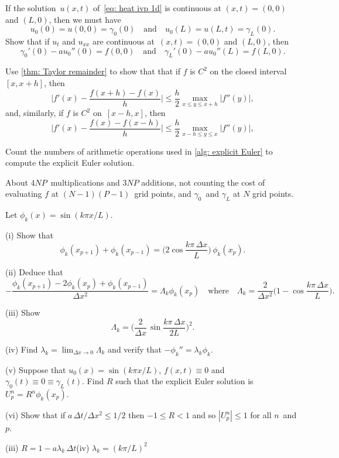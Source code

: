 \begin{Exercises}

\exercise
If the solution~$u(x,t)$ of~\eqref{eq: heat ivp 1d} is continuous
at $(x,t)=(0,0)$ and $(L,0)$, then we must have
\[
u_0(0)=u(0,0)=\gamma_0(0)\quad\text{and}\quad
u_0(L)=u(L,t)=\gamma_L(0).
\]
Show that if $u_t$ and $u_{xx}$ are continuous at~$(x,t)=(0,0)$ and $(L,0)$,
then
\[
\gamma_0'(0)-au_0''(0)=f(0,0)
\quad\text{and}\quad
\gamma_L'(0)-au_0''(L)=f(L,0).
\]

\exercise\label{ex: forward diff}
Use \cref{thm: Taylor remainder} to show that that if $f$ is $C^2$ on 
the closed interval~$[x,x+h]$, then
\[
\biggl|f'(x)-\frac{f(x+h)-f(x)}{h}\biggr|
	\le\frac{h}{2}\max_{x\le y\le x+h}|f''(y)|,
\]
and, similarly, if $f$ is $C^2$ on~$[x-h,x]$, then
\[
\biggl|f'(x)-\frac{f(x)-f(x-h)}{h}\biggr|
	\le\frac{h}{2}\max_{x-h\le y\le x}|f''(y)|,
\]

\exercise
Count the numbers of arithmetic operations used in \cref{alg: explicit Euler} 
to compute the explicit Euler solution.
\begin{ans}
About $4NP$~multiplications and $3NP$ additions, not counting the cost of
evaluating $f$ at $(N-1)(P-1)$~grid points, and $\gamma_0$~and $\gamma_L$
at $N$ grid points.
\end{ans}

\exercise
Let $\phi_k(x)=\sin(k\pi x/L)$.
\begin{description}
\item{(i)} Show that 
\[
\phi_k(x_{p+1})+\phi_k(x_{p-1})=\biggl(2\cos\frac{k\pi\,\Delta x}{L}\biggr)\,
	\phi_k(x_p).
\]
\item{(ii)} Deduce that
\[
-\frac{\phi_k(x_{p+1})-2\phi_k(x_p)+\phi_k(x_{p-1})}{\Delta x^2}
	=\Lambda_k\phi_k(x_p)\quad\text{where}\quad
\Lambda_k=\frac{2}{\Delta x^2}\biggl(1-\cos\frac{k\pi\,\Delta x}{L}\biggr).
\]
\item{(iii)} Show
\[
\Lambda_k=\biggl(\frac{2}{\Delta x}\,\sin\frac{k\pi\,\Delta x}{2L}\biggr)^2.
\]
\item{(iv)}
Find $\lambda_k=\lim_{\Delta x\to0}\Lambda_k$ and verify that 
$-\phi_k''=\lambda_k\phi_k$.
\item{(v)}
Suppose that $u_0(x)=\sin(k\pi x/L)$, $f(x,t)\equiv0$ and 
$\gamma_0(t)\equiv 0\equiv\gamma_L(t)$.  Find $R$ such that the explicit
Euler solution is~$U^n_p=R^n\phi_k(x_p)$.
\item{(vi)} Show that if $a\,\Delta t/\Delta x^2\le1/2$ then $-1\le R<1$
and so $|U^n_p|\le1$ for all $n$~and $p$.
\end{description}
\begin{ans}
(iii) $R=1-a\lambda_k\,\Delta t$\quad(iv) $\lambda_k=(k\pi/L)^2$
\end{ans}


\end{Exercises}
